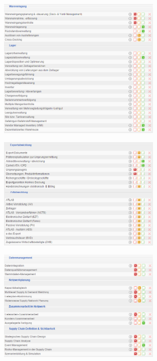\documentclass[12pt]{article}
\begin{document}
\begin{figure}[here!]
\centering
\includegraphics[width=0.7\textwidth]{images/tr24}
\end{figure}\FloatBarrier
\noindent
\begin{figure}[here!]
\centering
\includegraphics[width=0.7\textwidth]{images/tr25}
\end{figure}\FloatBarrier
\noindent
\begin{figure}[here!]
\centering
\includegraphics[width=0.7\textwidth]{images/tr26}
\end{figure}\FloatBarrier
\end{document}
